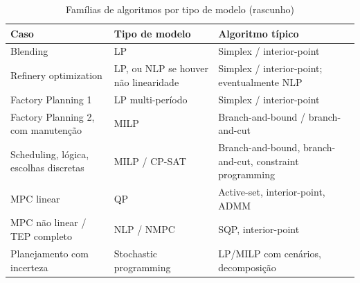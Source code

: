 \begin{table}[ht!]
\centering
\caption{Famílias de algoritmos por tipo de modelo (rascunho)}
\label{tab:algoritmos_otimizacao}
\footnotesize
\begin{tabular}{|p{3.0cm}|p{3.3cm}|p{6.0cm}|}
\hline
\textbf{Caso} & \textbf{Tipo de modelo} & \textbf{Algoritmo típico} \\
\hline
Blending & LP & Simplex / interior-point \\
\hline
Refinery optimization & LP, ou NLP se houver não linearidade & Simplex / interior-point; eventualmente NLP \\
\hline
Factory Planning 1 & LP multi-período & Simplex / interior-point \\
\hline
Factory Planning 2, com manutenção & MILP & Branch-and-bound / branch-and-cut \\
\hline
Scheduling, lógica, escolhas discretas & MILP / CP-SAT & Branch-and-bound, branch-and-cut, constraint programming \\
\hline
MPC linear & QP & Active-set, interior-point, ADMM \\
\hline
MPC não linear / TEP completo & NLP / NMPC & SQP, interior-point \\
\hline
Planejamento com incerteza & Stochastic programming & LP/MILP com cenários, decomposição \\
\hline
\end{tabular}
\end{table}


